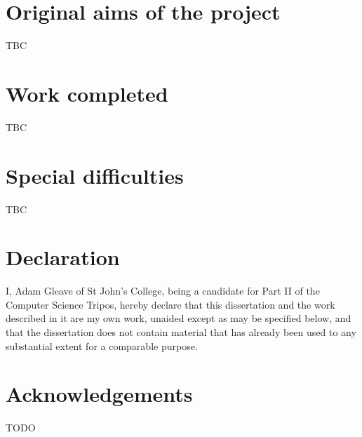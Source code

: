 \documentclass[12pt,a4paper,twoside,notitlepage]{report}
\theoremstyle{plain}
\theoremstyle{definition}
\theoremstyle{remark}
\begin{document}
\section*{Original aims of the project}

TBC

\vspace*{-1em}
\section*{Work completed}

TBC

\vspace*{-1em}
\section*{Special difficulties}

TBC

\newpage

\section*{Declaration}

I, Adam Gleave of St John's College, being a candidate for Part II of the 
Computer Science Tripos, hereby declare that this dissertation and the work 
described in it are my own work, unaided except as may be specified below, and
that the dissertation does not contain material that has already been used to
any substantial extent for a comparable purpose.

\bigskip
{}
\medskip
{}

\clearpage

\tableofcontents

\listofalgorithms
\listoffigures
\listoftables

\newpage
\section*{Acknowledgements}

TODO

\clearpage	%

\setcounter{page}{1}
\pagestyle{headings}



\cleardoublepage

\end{document}

